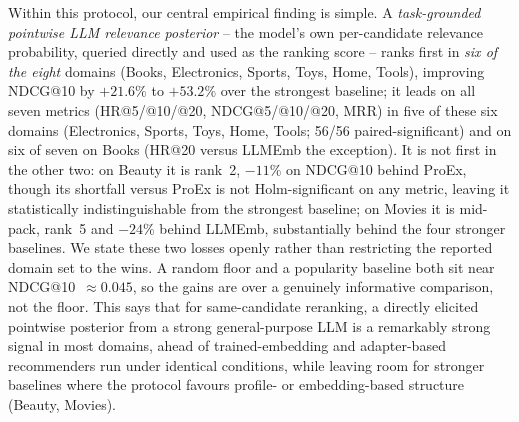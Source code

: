 Within this protocol, our central empirical finding is simple. A
\emph{task-grounded pointwise LLM relevance posterior} -- the model's own
per-candidate relevance probability, queried directly and used as the ranking
score -- ranks first in \emph{six of the eight} domains (Books, Electronics,
Sports, Toys, Home, Tools), improving NDCG@10 by $+21.6\%$ to $+53.2\%$ over the
strongest baseline; it leads on all seven metrics (HR@5/@10/@20,
NDCG@5/@10/@20, MRR) in five of these six domains (Electronics, Sports, Toys,
Home, Tools; 56/56 paired-significant) and on six of seven on Books (HR@20
versus LLMEmb the exception). It is not first in the other two:
on Beauty it is rank~2, $-11\%$ on NDCG@10 behind ProEx, though its shortfall
versus ProEx is not Holm-significant on any metric, leaving it statistically
indistinguishable from the strongest baseline; on Movies it is mid-pack,
rank~5 and $-24\%$ behind LLMEmb, substantially behind the four stronger
baselines. We state these two losses openly rather than
restricting the reported domain set to the wins. A random floor and a popularity
baseline both sit near NDCG@10~$\approx 0.045$, so the gains are over a
genuinely informative comparison, not the floor. This says that for
same-candidate reranking, a directly elicited pointwise posterior from a strong
general-purpose LLM is a remarkably strong signal in most domains, ahead of
trained-embedding and adapter-based recommenders run under identical conditions,
while leaving room for stronger baselines where the protocol favours
profile- or embedding-based structure (Beauty, Movies).

